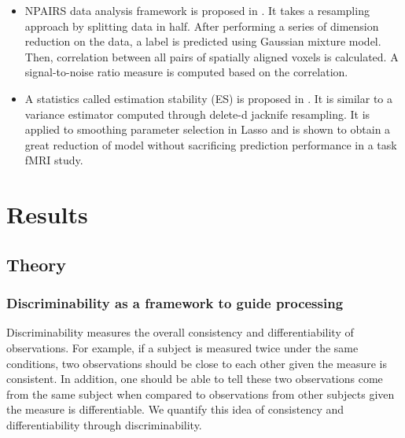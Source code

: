 \documentclass{article}
\begin{document}
\begin{itemize}
	\item NPAIRS data analysis framework is proposed in \cite{strother2002quantitative}. It takes a resampling approach by splitting data in half. After performing a series of dimension reduction on the data, a label is predicted using Gaussian mixture model. Then, correlation between 
	all pairs of spatially aligned voxels is calculated. A signal-to-noise ratio measure is computed based on the correlation.
	\item A statistics called estimation stability (ES) is proposed in \cite{yu2013stability}. It is similar to a variance estimator computed through delete-d jacknife resampling. It is applied to smoothing parameter selection in Lasso and is shown to obtain a great reduction of model without sacrificing prediction performance in a task fMRI study.
\end{itemize}


\section{Results}
\subsection{Theory}

\subsubsection{Discriminability as a framework to guide processing}
Discriminability measures the overall consistency and differentiability of observations. For example, if a subject is measured twice under the same conditions, two observations should be close to each other given the measure is consistent. In addition, one should be able to tell these two observations come from the same subject when compared to observations from other subjects given the measure is differentiable. We quantify this idea of consistency and differentiability through discriminability.
\end{document}
